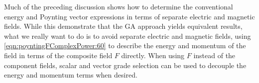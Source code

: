 Much of the preceding discussion shows how to determine the conventional energy and Poynting vector expressions in terms of separate electric and magnetic fields.
While this demonstrate that the GA approach yields equivalent results, what we really want to do is to
avoid separate electric and magnetic fields, using
\cref{eqn:poyntingFComplexPower:60} to describe the energy and momentum of the field in terms of the composite field \( F \) directly.
When using \( F \) instead of the component fields,
scalar and vector grade selection can be used to decouple the energy and momentum terms when desired.
